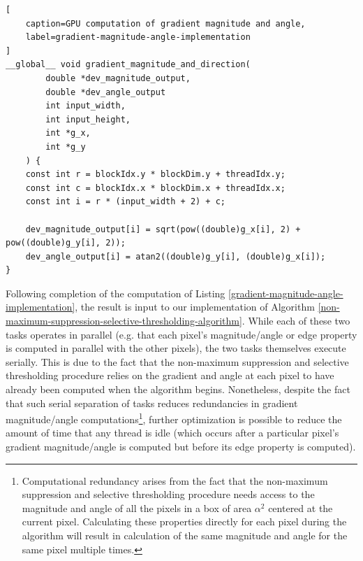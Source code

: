 \documentclass[journal]{IEEEtran}
\begin{document}
\begin{lstlisting}[
	caption=GPU computation of gradient magnitude and angle,
	label=gradient-magnitude-angle-implementation
]
__global__ void gradient_magnitude_and_direction(
		double *dev_magnitude_output,
		double *dev_angle_output
		int input_width,
		int input_height,
		int *g_x,
		int *g_y
	) {
	const int r = blockIdx.y * blockDim.y + threadIdx.y;
	const int c = blockIdx.x * blockDim.x + threadIdx.x;
	const int i = r * (input_width + 2) + c;
	
	dev_magnitude_output[i] = sqrt(pow((double)g_x[i], 2) + pow((double)g_y[i], 2));
	dev_angle_output[i] = atan2((double)g_y[i], (double)g_x[i]);
}
\end{lstlisting}
Following completion of the computation of Listing \ref{gradient-magnitude-angle-implementation}, the result is input to our implementation of Algorithm \ref{non-maximum-suppression-selective-thresholding-algorithm}. While each of these two tasks operates in parallel (e.g. that each pixel's magnitude/angle or edge property is computed in parallel with the other pixels), the two tasks themselves execute serially. This is due to the fact that the non-maximum suppression and selective thresholding procedure relies on the gradient and angle at each pixel to have already been computed when the algorithm begins. Nonetheless, despite the fact that such serial separation of tasks reduces redundancies in gradient magnitude/angle computations\footnote{Computational redundancy arises from the fact that the non-maximum suppression and selective thresholding procedure needs access to the magnitude and angle of all the pixels in a box of area $\alpha^2$ centered at the current pixel. Calculating these properties directly for each pixel during the algorithm will result in calculation of the same magnitude and angle for the same pixel multiple times.}, further optimization is possible to reduce the amount of time that any thread is idle (which occurs after a particular pixel's gradient magnitude/angle is computed but before its edge property is computed).
\end{document}
